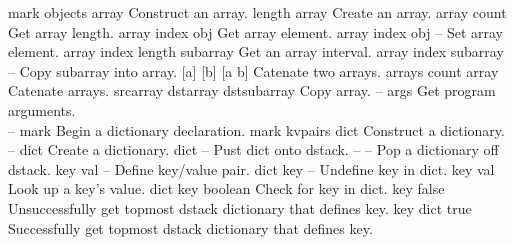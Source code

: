 \begin{longtable}{}
\hline
\optableent
	{mark objects}
	{{\bf \htmlref{]}{systemdict:sym_rb}}}
	{array}
	{Construct an array.}
\hline
\optableent
	{length}
	{{\bf {}}}
	{array}
	{Create an array.}
\hline
\optableent
	{array}
	{{\bf {}}}
	{count}
	{Get array length.}
\hline
\optableent
	{array index}
	{{\bf {}}}
	{obj}
	{Get array element.}
\hline
\optableent
	{array index obj}
	{{\bf {}}}
	{--}
	{Set array element.}
\hline
\optableent
	{array index length}
	{{\bf {}}}
	{subarray}
	{Get an array interval.}
\hline
\optableent
	{array index subarray}
	{{\bf {}}}
	{--}
	{Copy subarray into array.}
\hline
\optableent
	{[a] [b]}
	{{\bf {}}}
	{[a b]}
	{Catenate two arrays.}
\hline
\optableent
	{arrays count}
	{{\bf {}}}
	{array}
	{Catenate arrays.}
\hline
\optableent
	{srcarray dstarray}
	{{\bf {}}}
	{dstsubarray}
	{Copy array.}
\hline
\optableent
	{--}
	{{\bf {}}}
	{args}
	{Get program arguments.}
\hline \hline
{} \\
\hline \hline
\optableent
	{--}
	{{\bf {}}}
	{mark}
	{Begin a dictionary declaration.}
\hline
\optableent
	{mark kvpairs}
	{{\bf {}}}
	{dict}
	{Construct a dictionary.}
\hline
\optableent
	{--}
	{{\bf {}}}
	{dict}
	{Create a dictionary.}
\hline
\optableent
	{dict}
	{{\bf {}}}
	{--}
	{Pust dict onto dstack.}
\hline
\optableent
	{--}
	{{\bf {}}}
	{--}
	{Pop a dictionary off dstack.}
\hline
\optableent
	{key val}
	{{\bf {}}}
	{--}
	{Define key/value pair.}
\hline
\optableent
	{dict key}
	{{\bf {}}}
	{--}
	{Undefine key in dict.}
\hline
\optableent
	{key}
	{{\bf {}}}
	{val}
	{Look up a key's value.}
\hline
\optableent
	{dict key}
	{{\bf {}}}
	{boolean}
	{Check for key in dict.}
\hline
\optableent
	{key}
	{{\bf {}}}
	{false}
	{Unsuccessfully get topmost dstack dictionary that defines key.}
\hline
\optableent
	{key}
	{{\bf {}}}
	{dict true}
	{Successfully get topmost dstack dictionary that defines key.}
\hline

\end{longtable}
